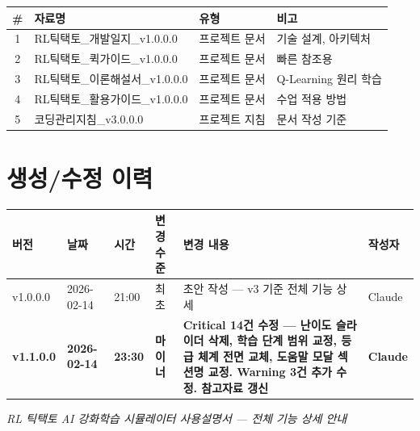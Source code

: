 \documentclass[11pt,a4paper]{article}
\begin{document}
\begin{center}
\renewcommand{\arraystretch}{1.4}
\begin{tabular}{|c|l|l|l|}
\hline
\rowcolor{tableheader}
\textbf{\#} & \textbf{자료명} & \textbf{유형} & \textbf{비고} \\
\hline
1 & RL틱택토\_개발일지\_v1.0.0.0 & 프로젝트 문서 & 기술 설계, 아키텍처 \\
\hline
2 & RL틱택토\_퀵가이드\_v1.0.0.0 & 프로젝트 문서 & 빠른 참조용 \\
\hline
3 & RL틱택토\_이론해설서\_v1.0.0.0 & 프로젝트 문서 & Q-Learning 원리 학습 \\
\hline
4 & RL틱택토\_활용가이드\_v1.0.0.0 & 프로젝트 문서 & 수업 적용 방법 \\
\hline
5 & 코딩관리지침\_v3.0.0.0 & 프로젝트 지침 & 문서 작성 기준 \\
\hline
\end{tabular}
\end{center}

\section*{생성/수정 이력}

\begin{center}
\renewcommand{\arraystretch}{1.3}
\small
\begin{tabular}{|l|l|l|l|p{6cm}|l|}
\hline
\rowcolor{tableheader}
\textbf{버전} & \textbf{날짜} & \textbf{시간} & \textbf{변경 수준} & \textbf{변경 내용} & \textbf{작성자} \\
\hline
v1.0.0.0 & 2026-02-14 & 21:00 & 최초 & 초안 작성 — v3 기준 전체 기능 상세 & Claude \\
\hline
\textbf{v1.1.0.0} & \textbf{2026-02-14} & \textbf{23:30} & \textbf{마이너} & \textbf{Critical 14건 수정 — 난이도 슬라이더 삭제, 학습 단계 범위 교정, 등급 체계 전면 교체, 도움말 모달 섹션명 교정. Warning 3건 추가 수정. 참고자료 갱신} & \textbf{Claude} \\
\hline
\end{tabular}
\end{center}

\vfill

\begin{center}
\small\color{lightbrown}
\emph{RL 틱택토 AI 강화학습 시뮬레이터 사용설명서 — 전체 기능 상세 안내}
\end{center}
\end{document}

